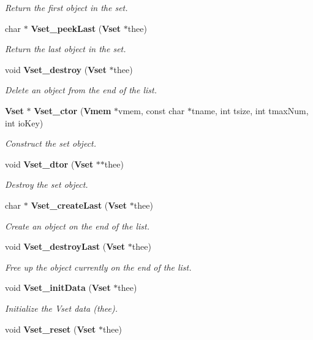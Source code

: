 \begin{DoxyCompactItemize}
\begin{DoxyCompactList}\small\item\em Return the first object in the set. \end{DoxyCompactList}\item 
char $\ast$ {\bf Vset\-\_\-peek\-Last} ({\bf Vset} $\ast$thee)
\begin{DoxyCompactList}\small\item\em Return the last object in the set. \end{DoxyCompactList}\item 
void {\bf Vset\-\_\-destroy} ({\bf Vset} $\ast$thee)
\begin{DoxyCompactList}\small\item\em Delete an object from the end of the list. \end{DoxyCompactList}\item 
{\bf Vset} $\ast$ {\bf Vset\-\_\-ctor} ({\bf Vmem} $\ast$vmem, const char $\ast$tname, int tsize, int tmax\-Num, int io\-Key)
\begin{DoxyCompactList}\small\item\em Construct the set object. \end{DoxyCompactList}\item 
void {\bf Vset\-\_\-dtor} ({\bf Vset} $\ast$$\ast$thee)
\begin{DoxyCompactList}\small\item\em Destroy the set object. \end{DoxyCompactList}\item 
char $\ast$ {\bf Vset\-\_\-create\-Last} ({\bf Vset} $\ast$thee)
\begin{DoxyCompactList}\small\item\em Create an object on the end of the list. \end{DoxyCompactList}\item 
void {\bf Vset\-\_\-destroy\-Last} ({\bf Vset} $\ast$thee)
\begin{DoxyCompactList}\small\item\em Free up the object currently on the end of the list. \end{DoxyCompactList}\item 
void {\bf Vset\-\_\-init\-Data} ({\bf Vset} $\ast$thee)
\begin{DoxyCompactList}\small\item\em Initialize the Vset data (thee). \end{DoxyCompactList}\item 
void {\bf Vset\-\_\-reset} ({\bf Vset} $\ast$thee)
$$
\end{DoxyCompactItemize}
